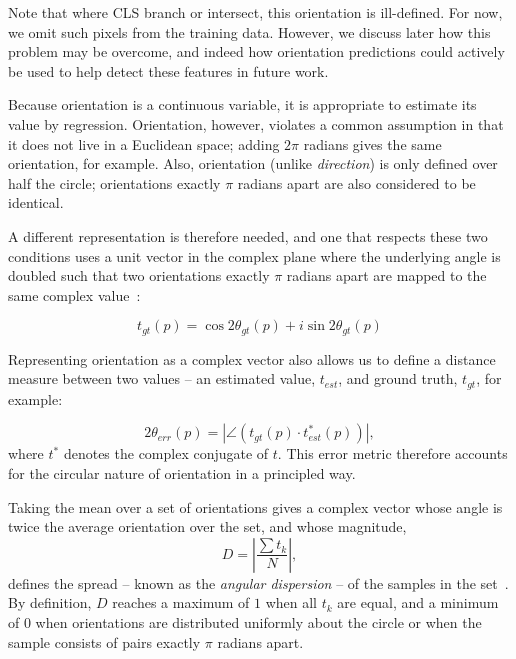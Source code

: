 \documentclass{IEEEtran}
\begin{document}
Note that where CLS branch or intersect, this orientation is ill-defined. For now, we omit such pixels from the training data. However, we discuss later how this problem may be overcome, and indeed how orientation predictions could actively be used to help detect these features in future work.

\label{s:orientation_representation}
%
Because orientation is a continuous variable, it is appropriate to estimate its value by regression. Orientation, however, violates a common assumption in that it does not live in a Euclidean space; adding $2\pi$ radians gives the same orientation, for example. Also, orientation (unlike \emph{direction}) is only defined over half the circle; orientations exactly $\pi$ radians apart are also considered to be identical.

A different representation is therefore needed, and one that respects these two conditions uses a unit vector in the complex plane where the underlying angle is doubled such that two orientations exactly $\pi$ radians apart are mapped to the same complex value~\cite{Mardia_Jupp_00}:

\begin{equation}
	t_{gt}(p) = \cos 2\theta_{gt}(p) + i\sin 2\theta_{gt}(p)
\end{equation}

Representing orientation as a complex vector also allows us to define a distance measure between two values -- an estimated value, $t_{est}$, and ground truth, $t_{gt}$, for example:

\begin{equation}
	2\theta_{err}(p) = |\angle(t_{gt}(p) \cdot t_{est}^*(p))|,
\end{equation}
%
\noindent where $t^*$ denotes the complex conjugate of $t$. This error metric therefore accounts for the circular nature of orientation in a principled way.

Taking the mean over a set of orientations gives a complex vector whose angle is twice the average orientation over the set, and whose magnitude,
%
\begin{equation}
D = \left| \frac{\sum{t_k}}{N} \right|,
\label{e:angular_dispersion}
\end{equation}
%
\noindent defines the spread -- known as the \emph{angular dispersion} -- of the samples in the set~\cite{Mardia_Jupp_00}. By definition, $D$ reaches a maximum of $1$ when all $t_k$ are equal, and a minimum of $0$ when orientations are distributed uniformly about the circle or when the sample consists of pairs exactly $\pi$ radians apart.
\end{document}
